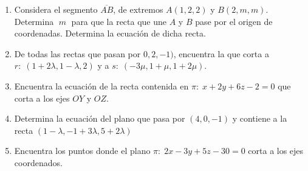 \begin{enumerate}
\item Considera el segmento $\overline{AB}$, de extremos $A(1,2,2)$ y $B(2,m,m)$. Determina $\;m\;$ para que la recta que une $A$ y $B$ pase por el origen de coordenadas. Determina la ecuación de dicha recta.

\vspace{2mm} 

\item De todas las rectas que pasan por $0,2,-1)$, encuentra la que corta a $r:\; (1+2\lambda, 1-\lambda, 2)$ y a $s:\; (-3\mu, 1+\mu, 1+2\mu)$.

\vspace{2mm} 

\item Encuentra la ecuación de la recta contenida en $\pi:\; x+2y+6z-2=0$ que corta a los ejes $OY$ y $OZ$.

\vspace{2mm} \hspace{-10mm}

\vspace{2mm} 

\item Determina la ecuación del plano que pasa por $(4,0,-1)$ y contiene a la recta $(1-\lambda, -1+3\lambda,5+2\lambda)$

\vspace{2mm} 

\item Encuentra los puntos donde el plano $\pi:\; 2x-3y+5z-30=0$ corta a los ejes coordenados.

\vspace{2mm} 

\vspace{-3mm} \hspace{-10mm}


\end{enumerate}
